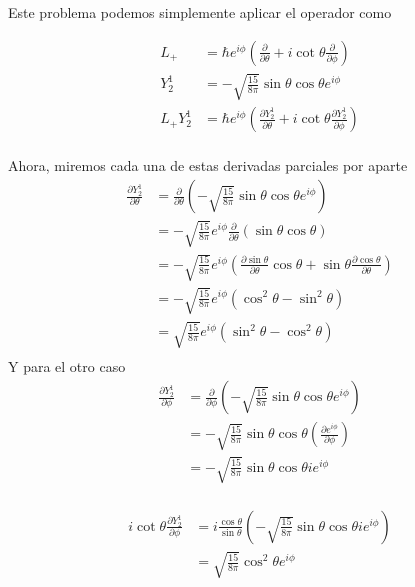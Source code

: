 \documentclass{report}
\begin{document}
\chapter{}

Este problema podemos simplemente aplicar el operador como

\begin{align*}
	L_+ &= \hbar e^{i\phi}\left( \frac{\partial}{\partial \theta} + i\cot\theta \frac{\partial}{\partial \phi}\right)\\
	Y_2^1 &= - \sqrt{\frac{15}{8\pi}}\sin\theta\cos\theta e^{i\phi}\\
	L_+ Y_2^1 &= \hbar e^{i\phi}\left( \frac{\partial Y_2^1}{\partial \theta} + i\cot\theta \frac{\partial Y_2^1}{\partial \phi} \right)\\
\end{align*}

Ahora, miremos cada una de estas derivadas parciales por aparte
\begin{align*}
	\frac{\partial Y_2^1}{\partial \theta} &= \frac{\partial}{\partial \theta} \left( -\sqrt{\frac{15}{8\pi}} \sin\theta\cos\theta e^{i\phi}\right)\\
	&= -\sqrt{\frac{15}{8\pi}}e^{i\phi} \frac{\partial}{\partial \theta}\left( \sin\theta\cos\theta \right)\\
	&= -\sqrt{\frac{15}{8\pi}}e^{i\phi} \left( \frac{\partial \sin\theta}{\partial \theta}\cos\theta + \sin\theta\frac{\partial\cos\theta}{\partial \theta} \right)\\
	&= -\sqrt{\frac{15}{8\pi}}e^{i\phi} \left( \cos^2\theta - \sin^2\theta \right)\\
	&= \sqrt{\frac{15}{8\pi}}e^{i\phi}\left( \sin^2\theta - \cos^2\theta \right)\\
\end{align*}
Y para el otro caso 
\begin{align*}
	\frac{\partial Y_2^1}{\partial \phi} &= \frac{\partial}{\partial \phi} \left( - \sqrt{\frac{15}{8\pi}}\sin\theta\cos\theta e^{i\phi}  \right)\\
	&= -\sqrt{\frac{15}{8\pi}}\sin\theta\cos\theta \left( \frac{\partial e^{i\phi}}{\partial \phi} \right)\\
	&= -\sqrt{\frac{15}{8\pi}}\sin\theta\cos\theta i e^{i\phi}\\
\end{align*}

\begin{align*}
	i\cot\theta \frac{\partial Y_2^1}{\partial \phi} &= i \frac{\cos\theta}{\sin\theta}\left( -\sqrt{\frac{15}{8\pi}}\sin\theta\cos\theta i e^{i\phi} \right)\\
	&= \sqrt{\frac{15}{8\pi}} \cos^2\theta e^{i\phi}
\end{align*}
\end{document}
